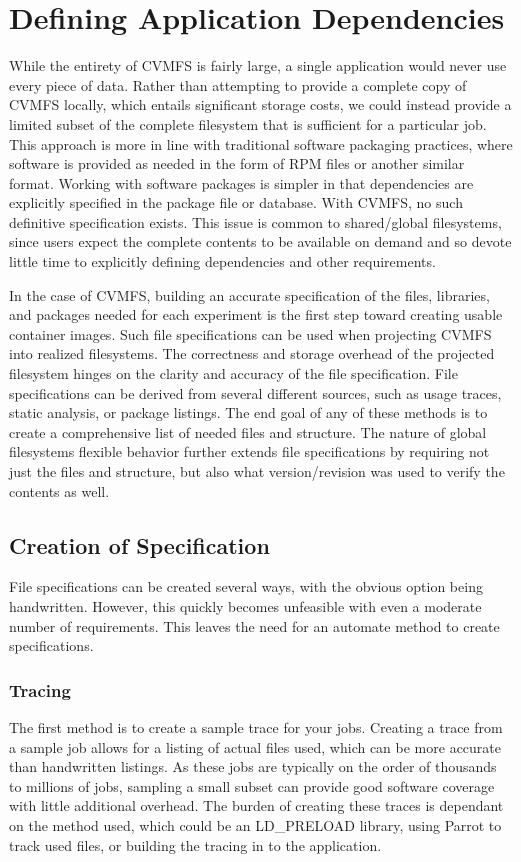 \documentclass[sigconf]{acmart}
\begin{document}
\section{Defining Application Dependencies}

While the entirety of CVMFS is fairly large,
a single application would never use every piece of data.
Rather than attempting to provide a complete copy of CVMFS locally,
which entails significant storage costs,
we could instead provide a limited subset of the complete filesystem that is sufficient for a particular job.
This approach is more in line with traditional software packaging practices,
where software is provided as needed in the form of RPM files or another similar format.
Working with software packages is simpler in that dependencies are explicitly specified in the package file or database.
With CVMFS, no such definitive specification exists.
This issue is common to shared/global filesystems,
since users expect the complete contents to be available on demand and so devote little time to explicitly defining dependencies and other requirements.

In the case of CVMFS,
building an accurate 
specification of the files, libraries, and packages
needed for each experiment is the first step toward creating usable container images.
Such file specifications can be used when 
projecting CVMFS into realized filesystems.
The correctness and storage overhead of the projected filesystem hinges on the clarity and accuracy of the file specification.
File specifications can be derived from several
different sources, such as 
usage traces, static analysis, or package listings.
The end goal of any of these methods is to 
create a comprehensive list of needed files and structure.
The nature of global filesystems flexible behavior
further extends file specifications by requiring
not just the files and structure, but also what
version/revision was used to verify the contents as well.

\subsection{Creation of Specification}
File specifications can be created several ways,
with the obvious option being handwritten.
However, this quickly becomes unfeasible with
even a moderate number of requirements.
This leaves the need for an automate method to create
specifications.

\subsubsection{Tracing}
The first method is to create a sample trace for your
jobs. 
Creating a trace from a sample job allows 
for a listing of actual files used, which
can be more accurate than handwritten listings.
As these jobs are typically on the order of thousands
to millions of jobs, sampling a small subset
can provide good software coverage with little
additional overhead. %
The burden of creating these traces is
dependant on the method used,
which could be an LD\_PRELOAD library,
using Parrot to track used files, %
or building the tracing in to the application.
\end{document}
